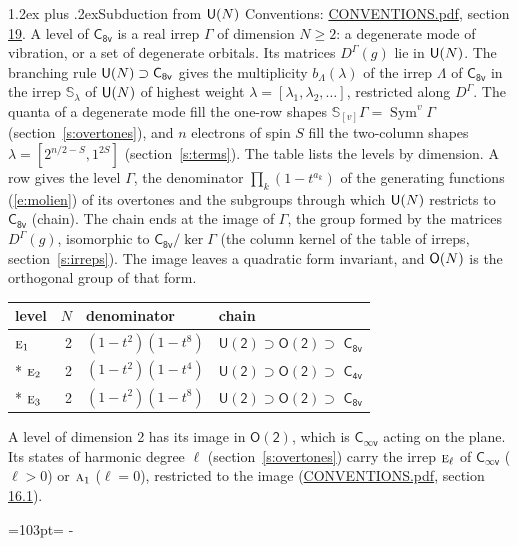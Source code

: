 \documentclass[10pt,a4paper]{article}
\makeatletter
\renewcommand\section{\@startsection{section}{1}{\z@}{-3ex plus -1ex minus -.2ex}%
  {1.2ex plus .2ex}{\normalfont\large\sffamily\bfseries\color{parttitle}}}
\newcommand{\needspace}[1]{\par\penalty-100\begingroup\dimen0=#1\relax\dimen2=\pagegoal
  \advance\dimen2-\pagetotal\ifdim\dimen0>\dimen2\relax\ifdim\dimen2>0pt\vfil\break\fi\fi
  \endgroup}
\numberwithin{equation}{section}
\newcommand{\grp}[1]{\mathsf{#1}}
\newcommand{\irr}[1]{\text{\normalfont\scshape #1}}
\newcommand{\repD}[1]{D^{#1}}
\newcommand{\schur}[1]{\mathbb{S}_{#1}}
\newcommand{\shape}[1]{[#1]}
\makeatother
\begin{document}
\section{Subduction from \texorpdfstring{$\grp{U(\mathnormal{N})}$}{U(N)}}\label{s:unitary}
Conventions: \href{../../CONVENTIONS.pdf}{CONVENTIONS.pdf}, section \href{../../CONVENTIONS.pdf\#conv.19}{19}.
\leavevmode\label{n:local.level.dimension}A level of $\grp{C_{8v}}$ is a real irrep $\Gamma$ of dimension $N \ge 2$: a degenerate mode of vibration, or a set of degenerate orbitals. \label{n:group.unitary}Its matrices $\repD{\Gamma}(g)$ lie in $\grp{U(\mathnormal{N})}$. \label{n:irrep.schur}\label{n:shape.partition}\label{n:local.partition}\label{n:function.multiplicity.unitary}The branching rule $\grp{U(\mathnormal{N})} \supset \grp{C_{8v}}$ gives the multiplicity $b_\Lambda(\lambda)$ of the irrep $\Lambda$ of $\grp{C_{8v}}$ in the irrep $\schur{\lambda}$ of $\grp{U(\mathnormal{N})}$ of highest weight $\lambda = \shape{\lambda_1, \lambda_2, \dots}$, restricted along $\repD{\Gamma}$. \label{n:local.partition.power}\label{n:local.electrons}\label{n:local.spin}The quanta of a degenerate mode fill the one-row shapes $\schur{\shape{v}}\Gamma = \operatorname{Sym}^{v}\Gamma$ (section~\ref{s:overtones}), and $n$ electrons of spin $S$ fill the two-column shapes $\lambda = \shape{2^{n/2-S}, 1^{2S}}$ (section~\ref{s:terms}).
The table lists the levels by dimension. \label{n:head.level}\label{n:head.denominator}\label{n:index.overtone.denominator}\label{n:head.chain}A row gives the level $\Gamma$, the denominator $\prod_k (1 - t^{a_k})$ of the generating functions (\ref{e:molien}) of its overtones and the subgroups through which $\grp{U(\mathnormal{N})}$ restricts to $\grp{C_{8v}}$ (chain). The chain ends at the image of $\Gamma$, the group formed by the matrices $\repD{\Gamma}(g)$, isomorphic to $\grp{C_{8v}}/\ker\Gamma$ (the column kernel of the table of irreps, section~\ref{s:irreps}). The image leaves a quadratic form invariant, and $\grp{O(\mathnormal{N})}$ is the orthogonal group of that form.
{\small\begin{longtable}{@{}lrll@{}}\toprule
level & $N$ & denominator & chain\\\midrule\endhead
\bottomrule\endfoot\endlastfoot
$\irr{e}_{1}$ & 2 & $(1-t^{2})(1-t^{8})$ & $\grp{U(2)} \supset \grp{O(2)} \supset$ \href{C8v.pdf}{$\grp{C_{8v}}$}\\*
$\irr{e}_{2}$ & 2 & $(1-t^{2})(1-t^{4})$ & $\grp{U(2)} \supset \grp{O(2)} \supset$ \href{C4v.pdf}{$\grp{C_{4v}}$}\\*
$\irr{e}_{3}$ & 2 & $(1-t^{2})(1-t^{8})$ & $\grp{U(2)} \supset \grp{O(2)} \supset$ \href{C8v.pdf}{$\grp{C_{8v}}$}\\
\bottomrule\end{longtable}}
A level of dimension 2 has its image in $\grp{O(2)}$, which is \href{Cinfv.pdf}{$\grp{C_{\infty v}}$} acting on the plane. \label{n:index.harmonic.degree}Its states of harmonic degree $\ell$ (section~\ref{s:overtones}) carry the irrep $\irr{e}_{\ell}$ of \href{Cinfv.pdf}{$\grp{C_{\infty v}}$} ($\ell > 0$) or $\irr{a}_{1}$ ($\ell = 0$), restricted to the image (\href{../../CONVENTIONS.pdf}{CONVENTIONS.pdf}, section \href{../../CONVENTIONS.pdf\#conv.16.1}{16.1}).
\needspace{103pt}
\end{document}
